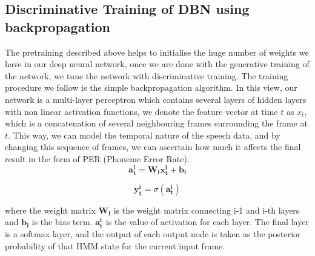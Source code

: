 \subsection{Discriminative Training of DBN using backpropagation}
The pretraining described above helps to initialise the huge number of weights we have in our deep neural network, once we are done with the generative training of the network, we tune the network with discriminative training. The training procedure we follow is the simple backpropagation algorithm. In this view, our network is a multi-layer perceptron which contains several layers of hidden layers with non linear activation functions, we denote the feature vector at time $t$ as $x_{t}$, which is a concatenation of several neighbouring frames surrounding the frame at $t$. This way, we can model the temporal nature of the speech data, and by changing this sequence of frames, we can ascertain how much it affects the final result in the form of PER (Phoneme Error Rate).
\begin{equation}
	\mathbf{a_{t}^{i}} = \mathbf{W_{i}}  \mathbf{x_{t}^{i}} + \mathbf{b_{i}}   
\end{equation}


\begin{equation}
	\mathbf{y_{t}^{i}} = \sigma(\mathbf{a_{t}^{i}})
\end{equation}



where the weight matrix $\mathbf{W_{i}}$ is the weight matrix connecting i-1 and i-th layers and $\mathbf{b_{i}}$ is the bias term. $\mathbf{a_{t}^{i}}$ is the value of activation for each layer. The final layer is a softmax layer, and the output of each output node is taken as the posterior probability of that HMM state for the current input frame.    



 

